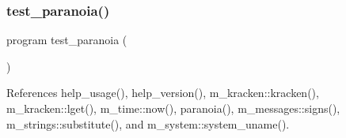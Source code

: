 \subsubsection{\texorpdfstring{test\+\_\+paranoia()}{test\_paranoia()}}
{\footnotesize\ttfamily program test\+\_\+paranoia (\begin{DoxyParamCaption}{ }\end{DoxyParamCaption})}



References help\+\_\+usage(), help\+\_\+version(), m\+\_\+kracken\+::kracken(), m\+\_\+kracken\+::lget(), m\+\_\+time\+::now(), paranoia(), m\+\_\+messages\+::signs(), m\+\_\+strings\+::substitute(), and m\+\_\+system\+::system\+\_\+uname().

